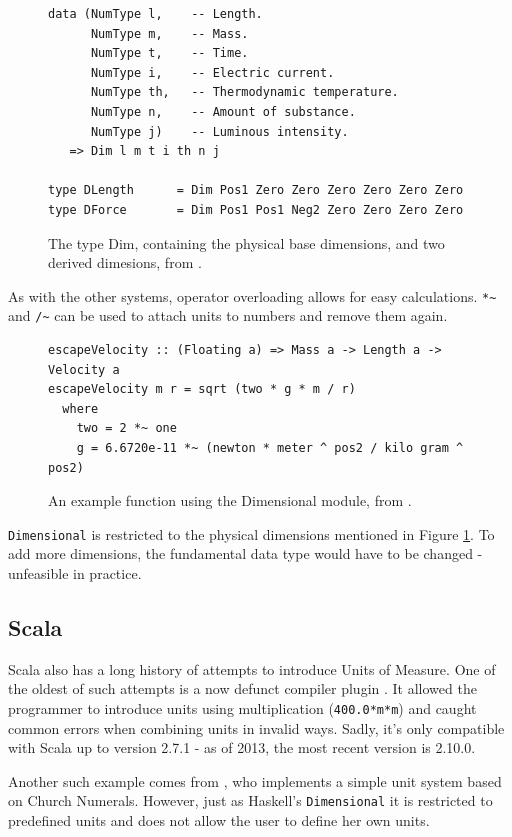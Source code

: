 \documentclass[12pt,oneside,a4paper]{scrbook}
\theoremstyle{definition}
\begin{document}
\begin{figure}
\begin{verbatim}
data (NumType l,    -- Length.
      NumType m,    -- Mass.
      NumType t,    -- Time.
      NumType i,    -- Electric current.
      NumType th,   -- Thermodynamic temperature.
      NumType n,    -- Amount of substance.
      NumType j)    -- Luminous intensity.
   => Dim l m t i th n j

type DLength      = Dim Pos1 Zero Zero Zero Zero Zero Zero
type DForce       = Dim Pos1 Pos1 Neg2 Zero Zero Zero Zero
\end{verbatim}
\caption{The type Dim, containing the physical base dimensions, and two derived dimesions, from \citep{Buckwalter06}.}
\label{code:haskell_dim}
\end{figure}


As with the other systems, operator overloading allows for easy calculations. \verb/*~/ and \verb|/~| can be used to attach units to numbers and remove them again.


\begin{figure}
\begin{verbatim}
escapeVelocity :: (Floating a) => Mass a -> Length a -> Velocity a
escapeVelocity m r = sqrt (two * g * m / r)
  where
    two = 2 *~ one
    g = 6.6720e-11 *~ (newton * meter ^ pos2 / kilo gram ^ pos2)
\end{verbatim}
\caption{An example function using the Dimensional module, from \citep{Buckwalter06}.}
\label{code:haskell_dimensional}
\end{figure}

\verb/Dimensional/ is restricted to the physical dimensions mentioned in Figure \ref{code:haskell_dim}. To add more dimensions, the fundamental data type would have to be changed - unfeasible in practice.


\subsection{Scala}

Scala also has a long history of attempts to introduce Units of Measure. One of the oldest of such attempts is a now defunct compiler plugin \citep{Nygard09}. It allowed the programmer to introduce units using multiplication (\verb/400.0*m*m/) and caught common errors when combining units in invalid ways. Sadly, it's only compatible with Scala up to version 2.7.1 - as of 2013, the most recent version is 2.10.0.

Another such example comes from \citep{McBeath08}, who implements a simple unit system based on Church Numerals. However, just as Haskell's \verb/Dimensional/ it is restricted to predefined units and does not allow the user to define her own units.
\end{document}
